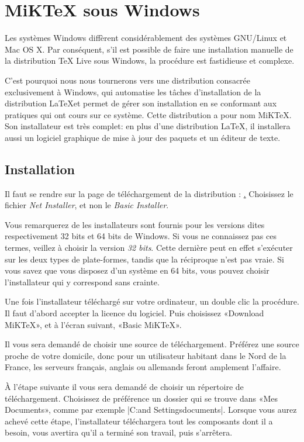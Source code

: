 \section{MiKTeX sous Windows}


Les systèmes Windows diffèrent considérablement des systèmes GNU/Linux et Mac OS X. Par conséquent, s'il est possible de faire une installation manuelle de la distribution TeX Live sous Windows, la procédure est fastidieuse et complexe.

C'est pourquoi nous nous tournerons vers une distribution consacrée exclusivement à Windows, qui automatise les tâches d'installation de la distribution \LaTeX et permet de gérer son installation en se conformant aux pratiques qui ont cours sur ce système. Cette distribution a pour nom MiKTeX. Son installateur est très complet: en plus d'une distribution \LaTeX{}, il installera aussi un logiciel graphique de mise à jour des paquets et un éditeur de texte.

\subsection{Installation}

Il faut se rendre sur la page de téléchargement de la distribution : \href{http://miktex.org/2.9/setup}. Choisissez le fichier \emph{Net Installer}, et non le \emph{Basic Installer}.

\begin{attention}
Vous remarquerez de les installateurs sont fournis pour les versions dites respectivement 32 bits et 64 bits de Windows. Si vous ne connaissez pas ces termes, veillez à choisir la version \emph{32 bits}. Cette dernière peut en effet s'exécuter sur les deux types de plate-formes, tandis que la réciproque n'est pas vraie. Si vous savez que vous disposez d'un système en 64 bits, vous pouvez choisir l'installateur qui y correspond sans crainte.
\end{attention}

Une fois l'installateur téléchargé sur votre ordinateur, un double clic la procédure. Il faut d'abord accepter la licence du logiciel. Puis choisissez «Download MiKTeX», et à l'écran suivant, «Basic MiKTeX».

Il vous sera demandé de choisir une source de téléchargement. Préférez une source proche de votre domicile, donc pour un utilisateur habitant dans le Nord de la France, les serveurs français, anglais ou allemands feront amplement l'affaire.

À l'étape suivante il vous sera demandé de choisir un répertoire de téléchargement. Choisissez de préférence un dossier qui se trouve dans «Mes Documents», comme par exemple \verbe|C:\Documents and Settings\Votreutilisateur\Mes documents\miktex|. Lorsque vous aurez achevé cette étape, l'installateur téléchargera tout les composants dont il a besoin, vous avertira qu'il a terminé son travail, puis s'arrêtera.

